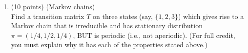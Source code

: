 \documentclass[12pt]{article}
\begin{document}
\begin{enumerate}
    
    
    
        
        
    
    
    
    
    
\newpage
\item\label{MCs} (10 points) (Markov chains)\\
    Find a transition matrix $T$ on three states (say, $\{1,2,3\}$) which gives rise to a Markov chain
    that is irreducible and has stationary distribution $\pi = (1/4, 1/2, 1/4)$, BUT is periodic (i.e., not aperiodic).
    (For full credit, you must explain why it has each of the properties stated above.)



    
    

\end{enumerate}
\end{document}
